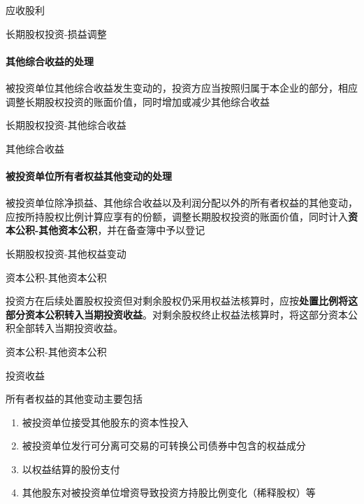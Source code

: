 \documentclass[UTF8,12pt]{ctexart}
\newenvironment{Dr}{%
	\begin{list}{}%
		{
			\setlength{\leftmargin}{2em}
			\setlength{\labelwidth}{2em}
			\setlength{\labelsep}{0pt}
			\setlength{\itemindent}{0pt}
			\setlength{\listparindent}{0pt}
			\setlength{\parsep}{0pt}
			\setlength{\topsep}{0pt}
		}
		\item[\textbf{借：}]
	}{%
	\end{list}
}
\newenvironment{Cr}{%
	\begin{list}{}%
		{
			\setlength{\leftmargin}{2em}
			\setlength{\labelwidth}{2em}
			\setlength{\labelsep}{0pt}
			\setlength{\itemindent}{0pt}
			\setlength{\listparindent}{0pt}
			\setlength{\parsep}{0pt}
			\setlength{\topsep}{0pt}
		}
		\item[\textbf{贷：}]
	}{%
	\end{list}
}
\numberwithin{equation}{section} %
\numberwithin{figure}{section}
\numberwithin{table}{section}
\begin{document}
	\begin{Dr}
		应收股利
	\end{Dr}
	\begin{Cr}
		长期股权投资-损益调整
	\end{Cr}
	
	
	
	\paragraph{其他综合收益的处理}
	被投资单位其他综合收益发生变动的，投资方应当按照归属于本企业的部分，相应调整长期股权投资的账面价值，同时增加或减少其他综合收益
	
	\begin{Dr}
		长期股权投资-其他综合收益
	\end{Dr}
	\begin{Cr}
		其他综合收益
	\end{Cr}
	
	\paragraph{被投资单位所有者权益其他变动的处理}
	被投资单位除净损益、其他综合收益以及利润分配以外的所有者权益的其他变动，应按所持股权比例计算应享有的份额，调整长期股权投资的账面价值，同时计入\textbf{资本公积-其他资本公积}，并在备查簿中予以登记
	
	\begin{Dr}
		长期股权投资-其他权益变动
	\end{Dr}
	\begin{Cr}
		资本公积-其他资本公积
	\end{Cr}
	
	投资方在后续处置股权投资但对剩余股权仍采用权益法核算时，应按\textbf{处置比例将这部分资本公积转入当期投资收益}。对剩余股权终止权益法核算时，将这部分资本公积全部转入当期投资收益。
	
	\begin{Dr}
		资本公积-其他资本公积
	\end{Dr}
	\begin{Cr}
		投资收益
	\end{Cr}
	
	所有者权益的其他变动主要包括
	\begin{enumerate}
		\item 被投资单位接受其他股东的资本性投入
		
		\item 被投资单位发行可分离可交易的可转换公司债券中包含的权益成分
		
		\item 以权益结算的股份支付
		
		\item 其他股东对被投资单位增资导致投资方持股比例变化（稀释股权）等
	\end{enumerate}
	
\end{document}
